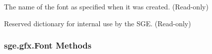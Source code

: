 \documentclass[letterpaper,10pt,english]{sphinxmanual}
\begin{document}
\begin{fulllineitems}

\begin{fulllineitems}
\label{gfx:sge.gfx.Font.name}
The name of the font as specified when it was created.
(Read-only)

\end{fulllineitems}


\begin{fulllineitems}
\label{gfx:sge.gfx.Font.rd}
Reserved dictionary for internal use by the SGE.  (Read-only)

\end{fulllineitems}


\end{fulllineitems}



\subsubsection{sge.gfx.Font Methods}
\label{gfx:sge-gfx-font-methods}
\end{document}
